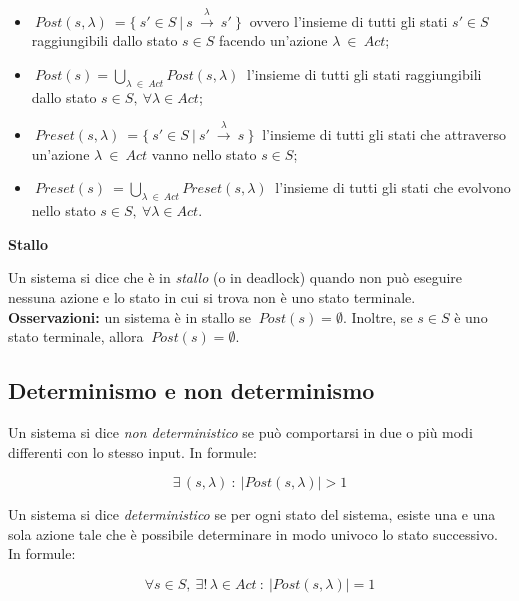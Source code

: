  \begin{itemize}
  \item $\ Post( s, \lambda )\ = \{\ s' \in S\ |\ s\ \xrightarrow{ \lambda }\ s'\ \}\ $ ovvero l'insieme di tutti gli stati $s' \in S$ raggiungibili dallo stato $s \in S$ facendo un'azione $\lambda\ \in\ Act$;
  
  \item $\ Post(s) = \bigcup_{\lambda\ \in\ Act}^{} Post( s, \lambda )\ $ l'insieme di tutti gli stati raggiungibili dallo stato $s \in S,\ \forall \lambda \in Act$;
  
  \item $\ Preset( s, \lambda )\ = \{\ s' \in S\ |\ s'\ \xrightarrow{ \lambda }\ s\ \}\ $ l'insieme di tutti gli stati che attraverso un'azione $\lambda\ \in\ Act$ vanno nello stato $s \in S$;
  
  \item $\ Preset( s )\ = \bigcup_{\lambda\ \in\ Act}^{} Preset( s, \lambda )\ $ l'insieme di tutti gli stati che evolvono nello stato $s \in S,\ \forall \lambda \in Act$.
 \end{itemize}
 
\textbf{Stallo}

Un sistema si dice che è in \emph{stallo} (o in deadlock) quando non può eseguire nessuna azione e lo stato in cui si trova non è uno stato terminale.
\\
 
\textbf{Osservazioni:} un sistema è in stallo se $\ Post(s) = \emptyset $. Inoltre, se $s \in S$ è uno stato terminale, allora $\ Post(s) = \emptyset $.
\\

\clearpage

\subsection{Determinismo e non determinismo}
Un sistema si dice \emph{non deterministico} se può comportarsi in due o più modi differenti con lo stesso input. In formule:

\begin{equation}
 \exists \, (s, \lambda)\ :\ \rvert Post( s, \lambda ) \rvert > 1
\end{equation}

Un sistema si dice \emph{deterministico} se per ogni stato del sistema, esiste una e una sola azione tale che è possibile determinare in modo univoco lo stato successivo. In formule:

\begin{equation}
 \forall s \in S,\ \exists! \, \lambda \in Act\ :\ \rvert Post( s, \lambda ) \rvert = 1
\end{equation}

